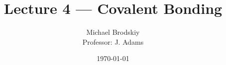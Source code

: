 


\title{Lecture 4 — Covalent Bonding}
\date{\today}
\author{Michael Brodskiy\\ \small Professor: J. Adams}



\maketitle


